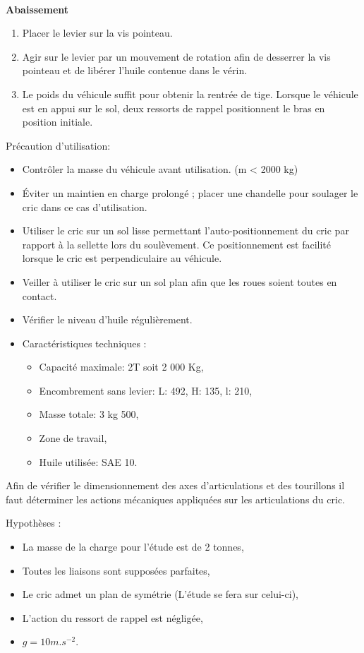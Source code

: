 ~\

\textbf{Abaissement}

\begin{enumerate}
 \item Placer le levier sur la vis pointeau. 
 \item Agir sur le levier par un mouvement de rotation afin de desserrer la vis pointeau et de libérer l'huile contenue dans le vérin. 
 \item Le poids du véhicule suffit pour obtenir la rentrée de tige. Lorsque le véhicule est en appui sur le sol, deux ressorts de rappel positionnent le bras en position initiale. 
\end{enumerate}


Précaution d'utilisation:

\begin{itemize}
 \item Contrôler la masse du véhicule avant utilisation. (m < 2000 kg) 
 \item Éviter un maintien en charge prolongé ; placer une chandelle pour soulager le cric dans ce cas d'utilisation. 
 \item Utiliser le cric sur un sol \og lisse \fg permettant l'auto-positionnement du cric par rapport à la sellette lors du soulèvement. Ce positionnement est facilité lorsque le cric est perpendiculaire au véhicule. 
 \item Veiller à utiliser le cric sur un sol plan afin que les roues soient toutes en contact. 
 \item Vérifier le niveau d'huile régulièrement.  
 \item Caractéristiques techniques : 
 \begin{itemize}
  \item Capacité maximale: 2T soit 2 000 Kg,
  \item Encombrement sans levier: L: 492, H: 135, l: 210,
  \item Masse totale: 3 kg 500,
  \item Zone de travail,
  \item Huile utilisée: SAE 10.
 \end{itemize}
\end{itemize}

 
Afin de vérifier le dimensionnement des axes d'articulations et des tourillons il faut déterminer les actions mécaniques appliquées sur les articulations du cric. 
 
Hypothèses : 
\begin{itemize}
 \item La masse de la charge pour l'étude est de 2 tonnes,
 \item Toutes les liaisons sont supposées parfaites,
 \item Le cric admet un plan de symétrie (L'étude se fera sur celui-ci),
 \item L'action du ressort de rappel est négligée,
 \item $g=10m.s^{-2}$.
\end{itemize}

